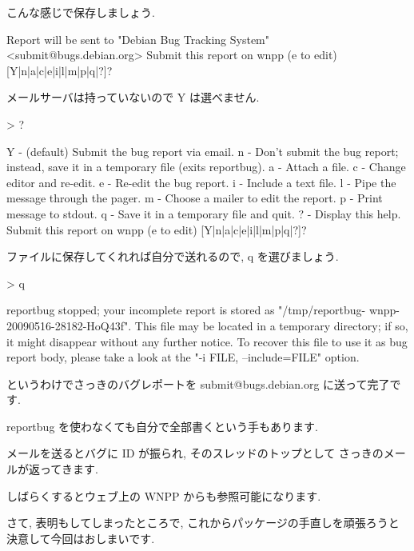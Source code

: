 \documentclass[mingoth,a4paper]{jsarticle}
\begin{document}
\begin{commandline}
こんな感じで保存しましょう.

\begin{commandline}
Report will be sent to "Debian Bug Tracking System" <submit@bugs.debian.org>
Submit this report on wnpp (e to edit) [Y|n|a|c|e|i|l|m|p|q|?]?
\end{commandline}

メールサーバは持っていないので Y は選べません.

\begin{commandline}
> ?

Y - (default) Submit the bug report via email.
n - Don't submit the bug report; instead, save it in a temporary file (exits
    reportbug).
a - Attach a file.
c - Change editor and re-edit.
e - Re-edit the bug report.
i - Include a text file.
l - Pipe the message through the pager.
m - Choose a mailer to edit the report.
p - Print message to stdout.
q - Save it in a temporary file and quit.
? - Display this help.
Submit this report on wnpp (e to edit) [Y|n|a|c|e|i|l|m|p|q|?]? 
\end{commandline}

ファイルに保存してくれれば自分で送れるので, q を選びましょう.

\begin{commandline}
> q

reportbug stopped; your incomplete report is stored as "/tmp/reportbug-
wnpp-20090516-28182-HoQ43f". This file may be located in a temporary directory;
if so, it might disappear without any further notice. To recover this file to
use it as bug report body, please take a look at the "-i FILE, --include=FILE"
option.
\end{commandline}

というわけでさっきのバグレポートを submit@bugs.debian.org に送って完了です.

reportbug を使わなくても自分で全部書くという手もあります.

メールを送るとバグに ID が振られ, そのスレッドのトップとして
さっきのメールが返ってきます.

しばらくするとウェブ上の WNPP からも参照可能になります.

さて, 表明もしてしまったところで, これからパッケージの手直しを頑張ろうと
決意して今回はおしまいです.



\end{commandline}
\end{document}
